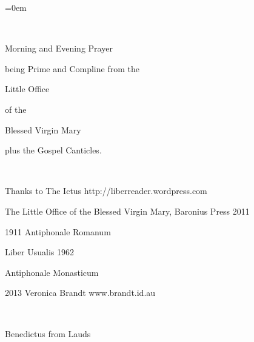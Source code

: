 \documentclass[12pt,a5paper]{memoir}
\newcommand{\setupParallel}{\begin{Parallel}{0.48\textwidth}{0.48\textwidth}}
\begin{document}
\parindent=0em %
%

\thispagestyle{empty}

\ 

\vskip1in

\begin{centering}

\HUGE \vectis Morning and Evening Prayer 

\bigskip

\bigskip

\bigskip

\large being Prime and Compline from the 

\bigskip

\bigskip



\LARGE Little Office



\large of the 

\LARGE Blessed Virgin Mary

\bigskip

\bigskip


\large plus the Gospel Canticles.


\ 

\vfill

\normalsize \normalfont 

Thanks to The Ictus http://liberreader.wordpress.com

The Little Office of the Blessed Virgin Mary, Baronius Press 2011

1911 Antiphonale Romanum

Liber Usualis 1962

Antiphonale Monasticum

2013 Veronica Brandt www.brandt.id.au

\newpage

\ 

\bigskip

\Huge \vectis Benedictus \large from Lauds

\end{centering}

\bigskip

\setupParallel

\end{Parallel}



\newpage


\ 

\bigskip
\end{document}
